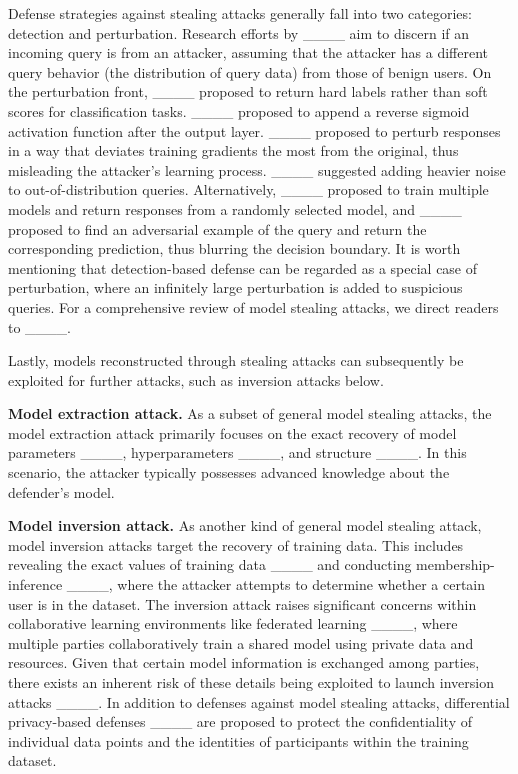     Defense strategies against stealing attacks generally fall into two categories: detection and perturbation. 
    Research efforts by ____ aim to discern if an incoming query is from an attacker, assuming that the attacker has a different query behavior (the distribution of query data) from those of benign users. 
    On the perturbation front, ____ proposed to return hard labels rather than soft scores for classification tasks. ____ proposed to append a reverse sigmoid activation function after the output layer. ____ proposed to perturb responses in a way that deviates training gradients the most from the original, thus misleading the attacker's learning process. ____ suggested adding heavier noise to out-of-distribution queries. Alternatively, ____ proposed to train multiple models and return responses from a randomly selected model, and ____ proposed to find an adversarial example of the query and return the corresponding prediction, thus blurring the decision boundary. 
    It is worth mentioning that detection-based defense can be regarded as a special case of perturbation, where an infinitely large perturbation is added to suspicious queries. For a comprehensive review of model stealing attacks, we direct readers to ____.

    Lastly, models reconstructed through stealing attacks can subsequently be exploited for further attacks, such as inversion attacks below.

    \textbf{Model extraction attack.} As a subset of general model stealing attacks, the model extraction attack primarily focuses on the exact recovery of model parameters ____, hyperparameters ____, and structure ____.  In this scenario, the attacker typically possesses advanced knowledge about the defender's model.


    \textbf{Model inversion attack.}  As another kind of general model stealing attack, model inversion attacks target the recovery of training data.
    This includes revealing the exact values of training data ____ and conducting membership-inference ____, where the attacker attempts to determine whether a certain user is in the dataset.
    The inversion attack raises significant concerns within collaborative learning environments like federated learning ____, where multiple parties collaboratively train a shared model using private data and resources. Given that certain model information is exchanged among parties, there exists an inherent risk of these details being exploited to launch inversion attacks ____.
    In addition to defenses against model stealing attacks, differential privacy-based defenses ____ are proposed to protect the confidentiality of individual data points and the identities of participants within the training dataset. 

